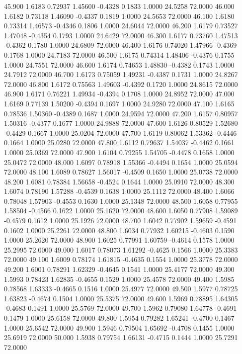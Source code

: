  45.900   1.6183   0.72937   1.45600  -0.4328   0.1833   1.0000  24.5258  72.0000
  46.000   1.6182   0.73118   1.46090  -0.4337   0.1819   1.0000  24.5653  72.0000
  46.100   1.6180   0.73314   1.46573  -0.4346   0.1806   1.0000  24.6044  72.0000
  46.200   1.6179   0.73527   1.47048  -0.4354   0.1793   1.0000  24.6429  72.0000
  46.300   1.6177   0.73760   1.47513  -0.4362   0.1780   1.0000  24.6809  72.0000
  46.400   1.6176   0.74020   1.47966  -0.4369   0.1768   1.0000  24.7183  72.0000
  46.500   1.6175   0.74314   1.48406  -0.4376   0.1755   1.0000  24.7551  72.0000
  46.600   1.6174   0.74653   1.48830  -0.4382   0.1743   1.0000  24.7912  72.0000
  46.700   1.6173   0.75059   1.49231  -0.4387   0.1731   1.0000  24.8267  72.0000
  46.800   1.6172   0.75563   1.49603  -0.4392   0.1720   1.0000  24.8615  72.0000
  46.900   1.6171   0.76221   1.49934  -0.4394   0.1708   1.0000  24.8952  72.0000
  47.000   1.6169   0.77139   1.50200  -0.4394   0.1697   1.0000  24.9280  72.0000
  47.100   1.6165   0.78536   1.50360  -0.4389   0.1687   1.0000  24.9594  72.0000
  47.200   1.6157   0.80957   1.50316  -0.4377   0.1677   1.0000  24.9888  72.0000
  47.600   1.6126   0.80529   1.52680  -0.4429   0.1667   1.0000  25.0204  72.0000
  47.700   1.6119   0.80062   1.53362  -0.4446   0.1664   1.0000  25.0280  72.0000
  47.800   1.6112   0.79637   1.54037  -0.4462   0.1661   1.0000  25.0369  72.0000
  47.900   1.6104   0.79255   1.54705  -0.4478   0.1658   1.0000  25.0472  72.0000
  48.000   1.6097   0.78918   1.55366  -0.4494   0.1654   1.0000  25.0594  72.0000
  48.100   1.6089   0.78627   1.56017  -0.4509   0.1650   1.0000  25.0738  72.0000
  48.200   1.6081   0.78384   1.56658  -0.4524   0.1644   1.0000  25.0910  72.0000
  48.300   1.6074   0.78190   1.57288  -0.4539   0.1638   1.0000  25.1112  72.0000
  48.400   1.6066   0.78048   1.57903  -0.4553   0.1630   1.0000  25.1348  72.0000
  48.500   1.6058   0.77955   1.58504  -0.4566   0.1622   1.0000  25.1620  72.0000
  48.600   1.6050   0.77908   1.59089  -0.4579   0.1612   1.0000  25.1926  72.0000
  48.700   1.6042   0.77902   1.59659  -0.4591   0.1602   1.0000  25.2261  72.0000
  48.800   1.6034   0.77932   1.60215  -0.4603   0.1590   1.0000  25.2620  72.0000
  48.900   1.6025   0.77991   1.60759  -0.4614   0.1578   1.0000  25.2995  72.0000
  49.000   1.6017   0.78073   1.61292  -0.4625   0.1566   1.0000  25.3383  72.0000
  49.100   1.6009   0.78174   1.61815  -0.4635   0.1554   1.0000  25.3778  72.0000
  49.200   1.6001   0.78291   1.62329  -0.4645   0.1541   1.0000  25.4177  72.0000
  49.300   1.5993   0.78423   1.62835  -0.4655   0.1529   1.0000  25.4578  72.0000
  49.400   1.5985   0.78568   1.63333  -0.4665   0.1516   1.0000  25.4977  72.0000
  49.500   1.5977   0.78725   1.63823  -0.4674   0.1504   1.0000  25.5375  72.0000
  49.600   1.5969   0.78895   1.64305  -0.4683   0.1491   1.0000  25.5769  72.0000
  49.700   1.5962   0.79080   1.64778  -0.4691   0.1479   1.0000  25.6158  72.0000
  49.800   1.5954   0.79282   1.65241  -0.4700   0.1467   1.0000  25.6542  72.0000
  49.900   1.5946   0.79504   1.65692  -0.4708   0.1455   1.0000  25.6919  72.0000
  50.000   1.5938   0.79754   1.66131  -0.4715   0.1444   1.0000  25.7291  72.0000
